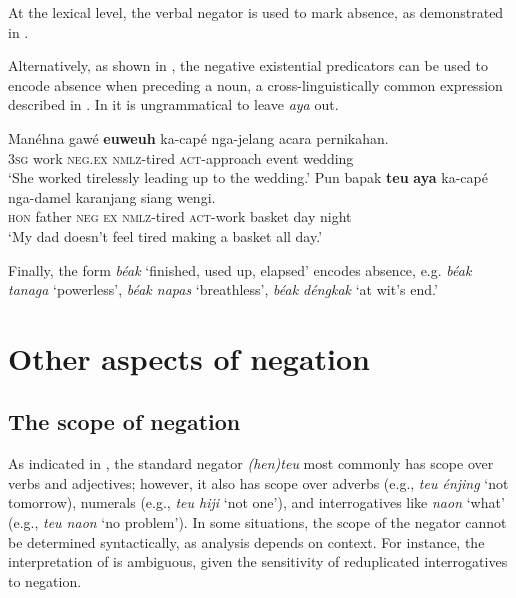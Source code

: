 \documentclass[output=paper]{langscibook}
\begin{document}
At the lexical level, the verbal negator is used to mark absence, as demonstrated in . 

Alternatively, as shown in , the negative existential predicators can be used to encode absence when preceding a noun, a cross-linguistically common expression described in \citet{Veselinova2013neg.exist}. In  it is ungrammatical to leave \textit{aya} out.

 \ea\label{ex:sun:47}
    \ea\label{ex:sun:47a}
        \gll  Manéhna gawé \textbf{euweuh} ka-capé nga-jelang acara pernikahan. \\ 
              3\textsc{sg} work \textsc{neg}.\textsc{ex} \textsc{nmlz}{}-tired \textsc{act}{}-approach event wedding\\
        \glt ‘She worked tirelessly leading up to the wedding.’
    \ex\label{ex:sun:47b}
        \gll  Pun bapak \textbf{teu} \textbf{aya} ka-capé nga-damel karanjang siang wengi.\\
              \textsc{hon} father \textsc{neg} \textsc{ex} \textsc{nmlz}{}-tired \textsc{act}{}-work basket day night\\
        \glt ‘My dad doesn’t feel tired making a basket all day.’ \citep[110]{Butters2021}
    \z
\z 

Finally, the form \textit{béak} ‘finished, used up, elapsed’ encodes absence, e.g. \textit{béak} \textit{tanaga} ‘powerless’, \textit{béak napas} ‘breathless’, \textit{béak déngkak} ‘at wit’s end.’

\section{Other aspects of negation}\label{sec:sun:4}

\subsection{The scope of negation}\label{sec:sun:4.1}

As indicated in , the standard negator \textit{(hen)teu} most commonly has scope over verbs and adjectives; however, it also has scope over adverbs (e.g., \textit{teu énjing} ‘not tomorrow), numerals (e.g., \textit{teu hiji} ‘not one’), and interrogatives like \textit{naon} ‘what’ (e.g., \textit{teu naon} ‘no problem’). In some situations, the scope of the negator cannot be determined syntactically, as analysis depends on context. For instance, the interpretation of  is ambiguous, given the sensitivity of reduplicated interrogatives to negation. 
\end{document}

